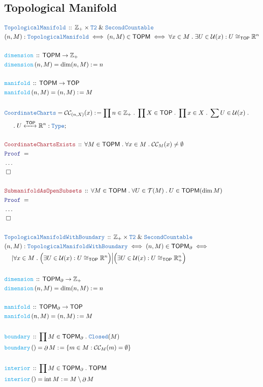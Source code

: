 \documentclass[12pt]{scrartcl}
\newcommand{\TYPE}[1]{\textcolor{NavyBlue}{\mathtt{#1}}}
\newcommand{\FUNC}[1]{\textcolor{Cerulean}{\mathtt{#1}}}
\newcommand{\LOGIC}[1]{\textcolor{Blue}{\mathtt{#1}}}
\newcommand{\THM}[1]{\textcolor{Maroon}{\mathtt{#1}}}
\renewcommand{\.}{\; . \;}
\newcommand{\de}{: \kern 0.1pc =}
\newcommand{\Act}[1]{\left( #1 \right)}
\newcommand{\Theorem}[2]{& \THM{#1} \, :: \, #2 \\ & \Proof = \\ }
\newcommand{\DeclareType}[2]{& \TYPE{#1} \, :: \, #2 \\}
\newcommand{\DefineNamedType}[4]{& #1 : \TYPE{#2} \iff #3 \iff #4 \\}
\newcommand{\DeclareFunc}[2]{& \FUNC{#1} \, :: \, #2 \\}
\newcommand{\DefineNamedFunc}[4]{&  \FUNC{#1}\Act{#2} = #3 \de #4 \\}
\newcommand{\NewLine}{\\ & \kern 1pc}
\newcommand{\Page}[1]{ \begin{align*} #1 \end{align*}   }
\newcommand{\NoProof}{ & \ldots \\ \EndProof}
\renewcommand{\And}{\; \& \;}
\newcommand{\Type}{\TYPE{Type}}
\newcommand{\Int}{\mathbb{Z} }
\newcommand{\Reals}{\mathbb{R} }
\newcommand{\ToIso}{\xleftrightarrow}
\newcommand{\Conclude}[3]{& #1 \de #2 : #3; \\}
\newcommand{\QED}{\; \square}
\newcommand{\EndProof}{& \QED \\}
\newcommand{\Proof}{\LOGIC{Proof} \; }
\newcommand{\C}{\mathcal{C}}
\DeclareMathOperator*{\intx}{int}
\DeclareMathOperator*{\boundary}{\partial}
\newcommand{\TOP}{\mathsf{TOP}}
\newcommand{\T}{\mathcal{T}}
\newcommand{\U}{\mathcal{U}}
\newcommand{\TOPM}{\mathsf{TOPM}}
\begin{document}
\subsection{Topological Manifold}
\Page{
	\DeclareType{TopologicalManifold}
	{
		\Int_+ \times \TYPE{T2} \And \TYPE{SecondCountable} 
	}
	\DefineNamedType{(n,M)}{TopologicalManifold}{(n,M) \in \TOPM}{\forall x \in M \. \exists U \in \U(x) : U \cong_{\TOP} \Reals^n}
	\\
	\DeclareFunc{dimension}{\TOPM \to \Int_+}
	\DefineNamedFunc{dimension}{n,M}{\dim (n,M)}{n}
	\\
	\DeclareFunc{manifold}{\TOPM \to \TOP}
	\DefineNamedFunc{manifold}{n,M}{(n,M)}{M}
	\\
	\Conclude{\TYPE{CoordinateCharts} = \C\C_{(n,X)}(x)}{
		\prod n \in \Int_+ \. 
		\prod X \in \TOP \. 
		\prod x \in X \. 
		\sum U \in \U(x) \.  \NewLine \. 
		U \ToIso{\TOP}\Reals^n }{\Type}
	\\
	\Theorem{CoordinateChartsExists}{ 
		\forall M \in \TOPM \. \forall x \in M \. \C\C_M(x) \neq \emptyset 
	}
	\NoProof
	\\
	\Theorem{SubmanifoldAsOpenSubsets}
	{
		\forall M \in \TOPM \.
		\forall U \in \T(M) \.
		U \in \TOPM(\dim M) 
	}
	\NoProof
	\\
	\DeclareType{TopologicalManifoldWithBoundary}
	{
		\Int_+ \times \TYPE{T2} \And \TYPE{SecondCountable} 
	}
	\DefineNamedType{(n,M)}{TopologicalManifoldWithBoundary}
	{(n,M) \in \TOPM_\partial}{
		\NewLine |
		\forall x \in M \. 
		\Big(\exists U \in \U(x) : U \cong_{\TOP} \Reals^n\Big)
		\Big|
		\Big(\exists U \in \U(x) : U \cong_{\TOP} \Reals^n_+\Big)
	}
	\\
	\DeclareFunc{dimension}{\TOPM_\partial \to \Int_+}
	\DefineNamedFunc{dimension}{n,M}{\dim (n,M)}{n}
	\\
	\DeclareFunc{manifold}{\TOPM_\partial \to \TOP}
	\DefineNamedFunc{manifold}{n,M}{(n,M)}{M}
	\\
	\DeclareFunc{boundary}{ \prod M \in \TOPM_\partial \. \TYPE{Closed}(M)   }
	\DefineNamedFunc{boundary}{}{\boundary M}{ \{ m \in M : \C\C_M(m) = \emptyset \} }
	\\
	\DeclareFunc{interior}{ \prod M \in \TOPM_\partial \. \TOPM   }
	\DefineNamedFunc{interior}{}{\intx M}{ M \setminus \boundary M }
}
\end{document}
